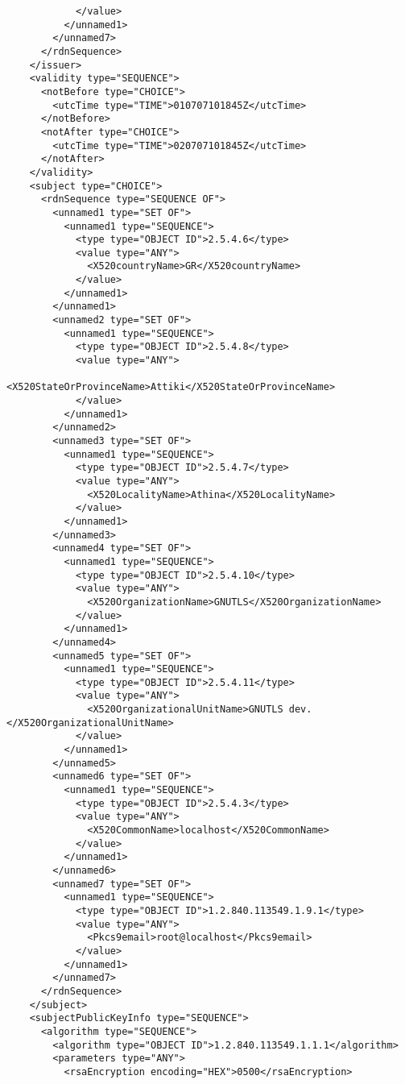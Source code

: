 \begin{verbatim}
            </value>
          </unnamed1>
        </unnamed7>
      </rdnSequence>
    </issuer>
    <validity type="SEQUENCE">
      <notBefore type="CHOICE">
        <utcTime type="TIME">010707101845Z</utcTime>
      </notBefore>
      <notAfter type="CHOICE">
        <utcTime type="TIME">020707101845Z</utcTime>
      </notAfter>
    </validity>
    <subject type="CHOICE">
      <rdnSequence type="SEQUENCE OF">
        <unnamed1 type="SET OF">
          <unnamed1 type="SEQUENCE">
            <type type="OBJECT ID">2.5.4.6</type>
            <value type="ANY">
              <X520countryName>GR</X520countryName>
            </value>
          </unnamed1>
        </unnamed1>
        <unnamed2 type="SET OF">
          <unnamed1 type="SEQUENCE">
            <type type="OBJECT ID">2.5.4.8</type>
            <value type="ANY">
              <X520StateOrProvinceName>Attiki</X520StateOrProvinceName>
            </value>
          </unnamed1>
        </unnamed2>
        <unnamed3 type="SET OF">
          <unnamed1 type="SEQUENCE">
            <type type="OBJECT ID">2.5.4.7</type>
            <value type="ANY">
              <X520LocalityName>Athina</X520LocalityName>
            </value>
          </unnamed1>
        </unnamed3>
        <unnamed4 type="SET OF">
          <unnamed1 type="SEQUENCE">
            <type type="OBJECT ID">2.5.4.10</type>
            <value type="ANY">
              <X520OrganizationName>GNUTLS</X520OrganizationName>
            </value>
          </unnamed1>
        </unnamed4>
        <unnamed5 type="SET OF">
          <unnamed1 type="SEQUENCE">
            <type type="OBJECT ID">2.5.4.11</type>
            <value type="ANY">
              <X520OrganizationalUnitName>GNUTLS dev.</X520OrganizationalUnitName>
            </value>
          </unnamed1>
        </unnamed5>
        <unnamed6 type="SET OF">
          <unnamed1 type="SEQUENCE">
            <type type="OBJECT ID">2.5.4.3</type>
            <value type="ANY">
              <X520CommonName>localhost</X520CommonName>
            </value>
          </unnamed1>
        </unnamed6>
        <unnamed7 type="SET OF">
          <unnamed1 type="SEQUENCE">
            <type type="OBJECT ID">1.2.840.113549.1.9.1</type>
            <value type="ANY">
              <Pkcs9email>root@localhost</Pkcs9email>
            </value>
          </unnamed1>
        </unnamed7>
      </rdnSequence>
    </subject>
    <subjectPublicKeyInfo type="SEQUENCE">
      <algorithm type="SEQUENCE">
        <algorithm type="OBJECT ID">1.2.840.113549.1.1.1</algorithm>
        <parameters type="ANY">
          <rsaEncryption encoding="HEX">0500</rsaEncryption>

\end{verbatim}
